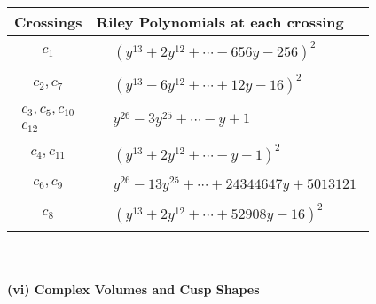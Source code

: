 \documentclass[1p]{elsarticle_modified}
\theoremstyle{definition}
\begin{document}
\begin{tabular}{m{50pt}|m{274pt}}
Crossings & \hspace{64pt}Riley Polynomials at each crossing \\
\hline $$\begin{aligned}c_{1}\end{aligned}$$&$\begin{aligned}
&(y^{13}+2 y^{12}+\cdots-656 y-256)^{2}
\end{aligned}$\\
\hline $$\begin{aligned}c_{2},c_{7}\end{aligned}$$&$\begin{aligned}
&(y^{13}-6 y^{12}+\cdots+12 y-16)^{2}
\end{aligned}$\\
\hline $$\begin{aligned}c_{3},c_{5},c_{10}\\c_{12}\end{aligned}$$&$\begin{aligned}
&y^{26}-3 y^{25}+\cdots- y+1
\end{aligned}$\\
\hline $$\begin{aligned}c_{4},c_{11}\end{aligned}$$&$\begin{aligned}
&(y^{13}+2 y^{12}+\cdots- y-1)^{2}
\end{aligned}$\\
\hline $$\begin{aligned}c_{6},c_{9}\end{aligned}$$&$\begin{aligned}
&y^{26}-13 y^{25}+\cdots+24344647 y+5013121
\end{aligned}$\\
\hline $$\begin{aligned}c_{8}\end{aligned}$$&$\begin{aligned}
&(y^{13}+2 y^{12}+\cdots+52908 y-16)^{2}
\end{aligned}$\\
\hline
\end{tabular}\\~\\
\newpage\flushleft \textbf{(vi) Complex Volumes and Cusp Shapes}
\end{document}
